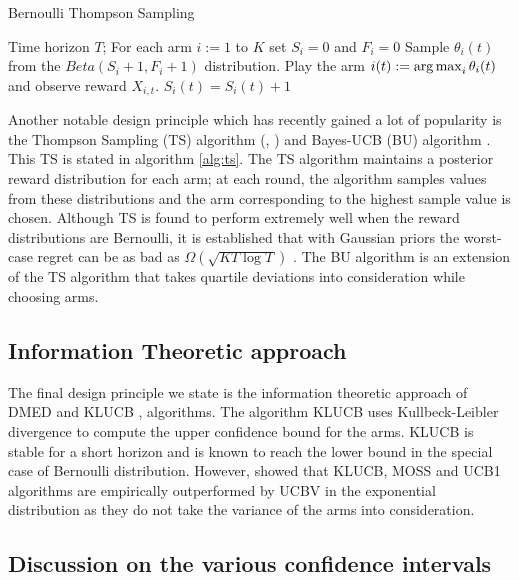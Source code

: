 \begin{algorithm}[!th]
\caption{Bernoulli Thompson Sampling}
\label{alg:ts}
\begin{algorithmic}
 Time horizon $T$; 
 For each arm $i:=1$ to $K$ set $S_i =0$ and $F_i =0$
\State {}
\State {}
\State Sample $\theta_{i}(t)$ from the $Beta(S_i+1,F_i+1)$ distribution.
\EndFor
\State Play the arm $i(t):=\operatorname*{arg\,max}_i\theta_i(t)$ and observe reward $X_{i,t}$.
$S_i (t) = S_i (t) + 1$
\EndIf
\EndFor
\end{algorithmic}
\end{algorithm}

    
    Another notable design principle which has recently gained a lot of popularity is the Thompson Sampling (TS) algorithm (\citep{thompson1933likelihood}, \citep{agrawal2011analysis})  and  Bayes-UCB (BU) algorithm \citep{kaufmann2012bayesian}. This TS is stated in algorithm \ref{alg:ts}. The TS algorithm maintains a posterior reward distribution for each arm; at each round, the algorithm samples values from these distributions and the arm corresponding to the highest sample value is chosen. Although TS is found to perform extremely well when the reward distributions are Bernoulli, it is established that with Gaussian priors the worst-case regret can be as bad as $\Omega \left( \sqrt{KT\log T}\right)$ \citep{lattimore2015optimally}. The BU algorithm is an extension of the TS algorithm that takes quartile deviations into consideration while choosing arms.

\subsection{Information Theoretic approach}
    
    The final design principle we state is the information theoretic approach of DMED  \citep{honda2010asymptotically} and KLUCB \citep{garivier2011kl},\citep{cappe2013kullback} algorithms. The algorithm KLUCB uses Kullbeck-Leibler divergence to compute the upper confidence bound for the arms. KLUCB is stable for a short horizon and is known to reach the \citet{lai1985asymptotically} lower bound in the special case of Bernoulli distribution. However, \citet{garivier2011kl} showed that KLUCB, MOSS and UCB1 algorithms are empirically outperformed by UCBV in the exponential distribution as they do not take the variance of the arms into consideration.
    
\subsection{Discussion on the various confidence intervals}

 